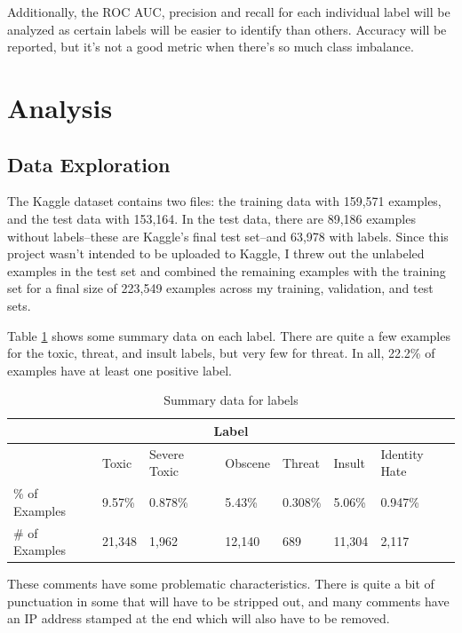 \documentclass[12pt]{article}
\begin{document}
Additionally, the ROC AUC, precision and recall for each individual label will be analyzed as certain labels will be easier to identify than others. Accuracy will be reported, but it's not a good metric when there's so much class imbalance.
\section*{Analysis}
\label{sec:org6a3b183}

\subsection*{Data Exploration}
\label{sec:org02b715e}
The Kaggle dataset contains two files: the training data with 159,571 examples, and the test data with 153,164. In the test data, there are 89,186 examples without labels--these are Kaggle's final test set--and 63,978 with labels. Since this project wasn't intended to be uploaded to Kaggle, I threw out the unlabeled examples in the test set and combined the remaining examples with the training set for a final size of 223,549 examples across my training, validation, and test sets.

Table \ref{table:1} shows some summary data on each label. There are quite a few examples for the toxic, threat, and insult labels, but very few for threat. In all, 22.2\% of examples have at least one positive label.

\begin{center}
\begin{table}
\begin{tabular}{| m{5em} | m{1.5cm} | m{1.5cm} | m{1.5cm} | m{1.5cm} | m{1.5cm} | m{1.5cm} |}
\hline
\multicolumn{7}{|c|}{Label} \\
\hline
& Toxic & Severe Toxic & Obscene & Threat & Insult & Identity Hate \\
\hline
\% of Examples & 9.57\% & 0.878\% & 5.43\% & 0.308\% & 5.06\% & 0.947\% \\
\hline
\# of Examples & 21,348 & 1,962 & 12,140 & 689 & 11,304 & 2,117 \\
\hline
\end{tabular}
\caption{Summary data for labels}
\label{table:1}
\end{table}
\end{center}

These comments have some problematic characteristics. There is quite a bit of punctuation in some that will have to be stripped out, and many comments have an IP address stamped at the end which will also have to be removed.
\end{document}
